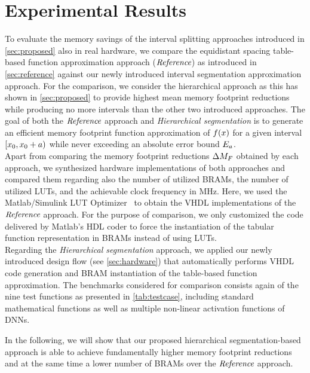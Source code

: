 \section{Experimental Results}
\label{sec:results}
To evaluate the memory savings of the interval splitting approaches introduced in \cref{sec:proposed} {also in real hardware}, we compare the {equidistant} spacing table-based function approximation approach ($\textit{Reference}$) {as introduced in \cref{sec:reference} against} our newly introduced interval segmentation approximation approach.
For the {comparison}, we consider the hierarchical approach {as this has shown in \cref{sec:proposed} to provide highest mean memory footprint reductions while producing no more intervals than the other two introduced approaches}.
The goal of {both} the $\textit{Reference}$ approach and {\textit{Hierarchical segmentation}} is to generate an efficient memory footprint function approximation of $f(x)$ for a given interval $[x_{0},x_{0}+a)$ {while never exceeding an} absolute error {bound} $E_a$.\\ 
Apart from comparing the memory footprint reductions {$\Delta M_{F}$} obtained by each approach, we {synthesized} hardware implementations of both approaches and compared them regarding {also} the number of utilized BRAMs, the number of utilized LUTs, and the achievable {clock} frequency in MHz.
Here, we used the Matlab/Simulink LUT Optimizer~\cite{MATLAB:reference} to obtain the VHDL implementation{s} of the $\textit{Reference}$ approach. {For the purpose of comparison, we} {only customized} the code delivered by Matlab's HDL coder to force the instantiation of the tabular function representation in BRAMs instead of using LUTs.\\
Regarding the {\textit{Hierarchical segmentation}} approach, we {applied} our newly introduced design flow (see \cref{sec:hardware}) that automatically performs VHDL code generation and BRAM instantiation of the table-based function approximation.
The {benchmarks} considered for comparison consists {again of the} {nine} test functions {as} presented in \cref{tab:testcase}, {including standard mathematical functions as well as multiple non-linear activation functions of \acp{DNN}}.\par
In the following, we will show that our proposed hierarchical segmentation-based approach is able to achieve {fundamentally higher} memory footprint reductions and at the same time a lower number of BRAMs {over the $\textit{Reference}$ approach}.
